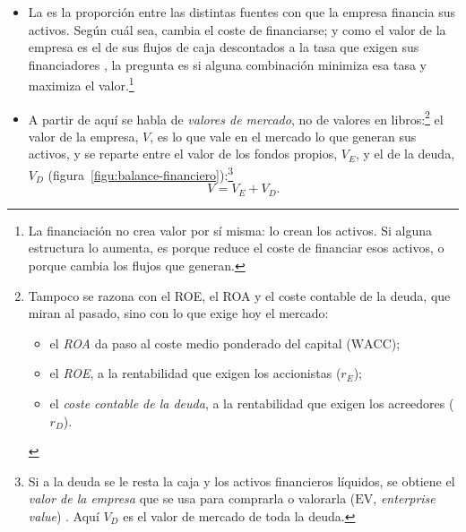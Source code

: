 \documentclass[11pt]{article}
\begin{document}
\begin{itemize}
\item La  es la proporción entre las distintas fuentes con que la empresa financia sus activos. Según cuál sea, cambia el coste de financiarse; y como el valor de la empresa es el de sus flujos de caja descontados a la tasa que exigen sus financiadores , la pregunta es si alguna combinación minimiza esa tasa y maximiza el valor.\footnote{La financiación no crea valor por sí misma: lo crean los activos. Si alguna estructura lo aumenta, es porque reduce el coste de financiar esos activos, o porque cambia los flujos que generan.}
\item A partir de aquí se habla de \emph{valores de mercado}, no de valores en libros:\footnote{Tampoco se razona con el ROE, el ROA y el coste contable de la deuda, que miran al pasado, sino con lo que exige hoy el mercado:
\begin{itemize}
\item el \emph{ROA} da paso al coste medio ponderado del capital ($\mathrm{WACC}$);
\item el \emph{ROE}, a la rentabilidad que exigen los accionistas ($r_E$);
\item el \emph{coste contable de la deuda}, a la rentabilidad que exigen los acreedores ($r_D$).\end{itemize}} el valor de la empresa, $V$, es lo que vale en el mercado lo que generan sus activos, y se reparte entre el valor de los fondos propios, $V_E$, y el de la deuda, $V_D$ (figura~\ref{figu:balance-financiero}):\footnote{Si a la deuda se le resta la caja y los activos financieros líquidos, se obtiene el \emph{valor de la empresa} que se usa para comprarla o valorarla ($\mathrm{EV}$, \emph{enterprise value}) . Aquí $V_D$ es el valor de mercado de toda la deuda.}
  \[
  V=V_E+V_D.
  \]
\end{itemize}

\begin{infografia}[H]
\centering
\caption{El balance financiero: valor de la empresa, de sus fondos propios y de su deuda}\label{figu:balance-financiero}
\end{infografia}
\end{document}
